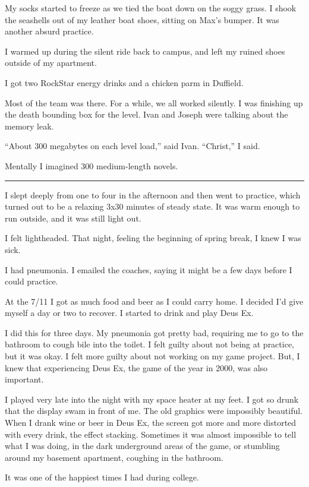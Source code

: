 My socks started to freeze as we tied the boat down on the soggy grass.  I shook
the seashells out of my leather boat shoes, sitting on Max's bumper.  It was
another absurd practice.  

I warmed up during the silent ride back to campus, and left my ruined shoes
outside of my apartment.  

I got two RockStar energy drinks and a chicken parm in Duffield.

Most of the team was there.  For a while, we all worked silently.  I was
finishing up the death bounding box for the level.  Ivan and Joseph were
talking about the memory leak.

``About 300 megabytes on each level load,'' said Ivan.  ``Christ,'' I said.

Mentally I imagined 300 medium-length novels.

\plainfancybreak{12pt}{2}{* * *}

I slept deeply from one to four in the afternoon and then went to practice,
which turned out to be a relaxing 3x30 minutes of steady state.  It was warm
enough to run outside, and it was still light out.

I felt lightheaded.  That night, feeling the beginning of spring break, I knew I
was sick.  

I had pneumonia.  I emailed the coaches, saying it might be a few days before I
could practice.  

At the 7/11 I got as much food and beer as I could carry home.  I decided I'd
give myself a day or two to recover.  I started to drink and play Deus Ex.  

I did this for three days.  My pneumonia got pretty bad, requiring me to go to
the bathroom to cough bile into the toilet.  I felt guilty about not being at
practice, but it was okay.  I felt more guilty about not working on my game
project.  But, I knew that experiencing Deus Ex, the game of the year in 2000,
was also important.

I played very late into the night with my space heater at my feet.  I got so
drunk that the display swam in front of me.  The old graphics were impossibly
beautiful.  When I drank wine or beer in Deus Ex, the screen got more and more
distorted with every drink, the effect stacking.  Sometimes it was almost
impossible to tell what I was doing, in the dark underground areas of the game,
or stumbling around my basement apartment, coughing in the bathroom.

It was one of the happiest times I had during college.

